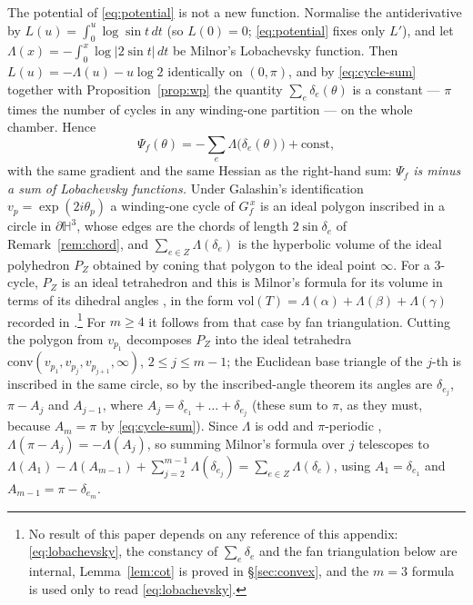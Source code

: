 \documentclass[11pt]{article}
\theoremstyle{definition}
\begin{document}
The potential of \eqref{eq:potential} is not a new function. Normalise the antiderivative by
$L(u)=\int_0^u\log\sin t\,dt$ (so $L(0)=0$; \eqref{eq:potential} fixes only $L'$), and let
$\Lambda(x)=-\int_0^x\log\lvert2\sin t\rvert\,dt$ be Milnor's Lobachevsky function. Then
$L(u)=-\Lambda(u)-u\log2$ identically on $(0,\pi)$, and by \eqref{eq:cycle-sum} together with
Proposition~\ref{prop:wp} the quantity $\sum_e\delta_e(\theta)$ is a constant --- $\pi$ times the number
of cycles in any winding-one partition --- on the whole chamber. Hence
\begin{equation}\label{eq:lobachevsky}
   \Psi_f(\theta)=-\sum_e\Lambda\bigl(\delta_e(\theta)\bigr)+\mathrm{const},
\end{equation}
with the same gradient and the same Hessian as the right-hand sum: \emph{$\Psi_f$ is minus a sum of
Lobachevsky functions.} Under Galashin's identification $v_p=\exp(2i\theta_p)$
\cite[Rem.~1.2]{Galashin} a winding-one cycle of $G_f^{\,x}$ is an ideal polygon inscribed in a circle in
$\partial\mathbb H^3$, whose edges are the chords of length $2\sin\delta_e$ of Remark~\ref{rem:chord},
and $\sum_{e\in Z}\Lambda(\delta_e)$ is the hyperbolic volume of the ideal polyhedron $P_Z$ obtained by
coning that polygon to the ideal point $\infty$. For a $3$-cycle, $P_Z$ is an ideal tetrahedron and this is
Milnor's formula for its volume in terms of its dihedral angles \cite[Appendix, Lem.~2]{Milnor}, in the form
$\mathrm{vol}(T)=\Lambda(\alpha)+\Lambda(\beta)+\Lambda(\gamma)$ recorded in
\cite[Lem.~5.1]{FuterGueritaud}.\footnote{No result of this paper depends on any reference of this
appendix: \eqref{eq:lobachevsky}, the constancy of $\sum_e\delta_e$ and the fan triangulation below are
internal, Lemma~\ref{lem:cot} is proved in \S\ref{sec:convex}, and the $m=3$ formula is used only to read
\eqref{eq:lobachevsky}.}
For $m\ge4$ it follows from that case by fan triangulation. Cutting the
polygon from $v_{p_1}$ decomposes $P_Z$ into the ideal tetrahedra
$\mathrm{conv}(v_{p_1},v_{p_j},v_{p_{j+1}},\infty)$, $2\le j\le m-1$; the Euclidean base triangle of the
$j$-th is inscribed in the same circle, so by the inscribed-angle theorem its angles are $\delta_{e_j}$,
$\pi-A_j$ and $A_{j-1}$, where $A_j=\delta_{e_1}+\dots+\delta_{e_j}$ (these sum to $\pi$, as they must,
because $A_m=\pi$ by \eqref{eq:cycle-sum}). Since $\Lambda$ is odd and $\pi$-periodic
\cite[Appendix, Lem.~1]{Milnor},
$\Lambda(\pi-A_j)=-\Lambda(A_j)$, so summing Milnor's formula over $j$ telescopes to
$\Lambda(A_1)-\Lambda(A_{m-1})+\sum_{j=2}^{m-1}\Lambda(\delta_{e_j})
=\sum_{e\in Z}\Lambda(\delta_e)$, using $A_1=\delta_{e_1}$ and $A_{m-1}=\pi-\delta_{e_m}$.
\end{document}
